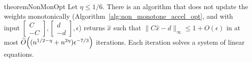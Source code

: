 \documentclass[11pt]{article}
\let\originalleft\left
\let\originalright\right
\renewcommand{\left}{\mathopen{}\mathclose\bgroup\originalleft}
\renewcommand{\right}{\aftergroup\egroup\originalright}
\newcommand\dd{\boldsymbol{\mathit{d}}}
\newcommand\xx{\boldsymbol{\mathit{x}}}
\newcommand\CC{\boldsymbol{\mathit{C}}}
\newcommand\xxhat{\widehat{\xx}}
\begin{document}
\begin{restatable}{theorem}{NonMonOpt}\label{thm:NonMonotoneMWUAcc}
Let $\eta \leq 1/6$. There is an algorithm that does not update the weights monotonically (Algorithm~\ref{alg:non_monotone_accel_opt}, and with input $\begin{bmatrix}
    \CC\\ -\CC
\end{bmatrix}, \begin{bmatrix}
    \dd\\ -\dd
\end{bmatrix}, \epsilon$) returns $\xxhat$ such that $\|\CC\xxhat-\dd\|_{\infty}\leq 1+O(\epsilon)$ in at most $\widetilde{O}\left((n^{1/2-\eta} + n^{2\eta})\epsilon^{-7/3}\right)$ iterations. Each iteration solves a system of linear equations.
\end{restatable}
\end{document}

